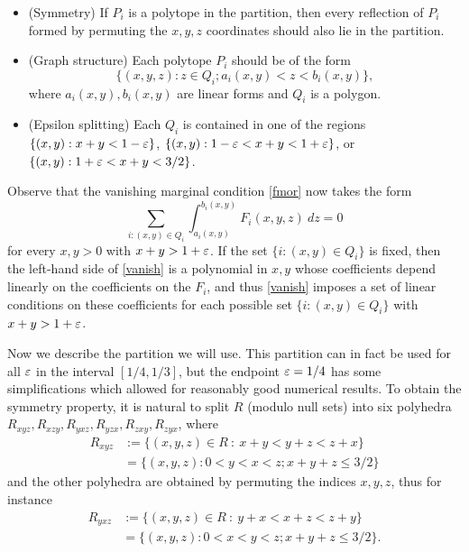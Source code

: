 \begin{itemize}
\item (Symmetry) If $P_i$ is a polytope in the partition, then every reflection of $P_i$ formed by permuting the $x,y,z$ coordinates should also lie in the partition.
\item (Graph structure) Each polytope $P_i$ should be of the form
\begin{equation}\label{qi-form}
\{ (x,y,z): z \in Q_i; a_i(x,y) < z < b_i(x,y)\},
\end{equation}
where $a_i(x,y), b_i(x,y)$ are linear forms and $Q_i$ is a polygon.
\item (Epsilon splitting)  Each $Q_i$ is contained in one of the regions $\{ (x,y): x+y < 1-\varepsilon\}$, $\{ (x,y): 1-\varepsilon < x+y < 1+\varepsilon \}$, or $\{ (x,y): 1+\varepsilon < x+y < 3/2 \}$.
\end{itemize}

Observe that the vanishing marginal condition \eqref{fmor} now takes the form
\begin{equation}\label{vanish}
 \sum_{i: (x,y) \in Q_i} \int_{a_i(x,y)}^{b_i(x,y)} F_i(x,y,z)\ dz = 0
\end{equation}
for every $x,y > 0$ with $x+y > 1+\varepsilon$.  If the set $\{i: (x,y) \in Q_i\}$ is fixed, then the left-hand side of \eqref{vanish} is a polynomial in $x,y$ whose coefficients depend linearly on the coefficients on the $F_i$, and thus \eqref{vanish} imposes a set of linear conditions on these coefficients for each possible set $\{ i: (x,y) \in Q_i\}$ with $x+y > 1+\varepsilon$.

Now we describe the partition we will use.  This partition can in fact be used for all $\varepsilon$ in the interval $[1/4,1/3]$, but the endpoint $\varepsilon = 1/4$ has some simplifications which allowed for reasonably good numerical results.  To obtain the symmetry property, it is natural to split $R$ (modulo null sets) into six polyhedra $R_{xyz}, R_{xzy}, R_{yxz}, R_{yzx}, R_{zxy}, R_{zyx}$, where
\begin{align*}
 R_{xyz} &:= \{(x,y,z)\in R\ :\ x+y < y+z < z+x\} \\
&= \{(x,y,z): 0 < y < x < z; x+y+z \leq 3/2 \}
\end{align*}
and the other polyhedra are obtained by permuting the indices $x,y,z$, thus for instance
\begin{align*}
R_{yxz} &:= \{(x,y,z)\in R\ :\ y+x < x+z < z+y\} \\
&= \{(x,y,z): 0 < x < y < z; x+y+z \leq 3/2 \}.
\end{align*}

